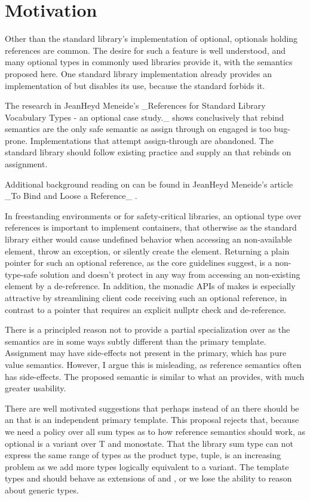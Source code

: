 \documentclass[a4paper,10pt,oneside,openany,final,article]{memoir}
\begin{document}
\chapter{Motivation}
Other than the standard library's implementation of optional, optionals holding references are common. The desire for such a feature is well understood, and many optional types in commonly used libraries provide it, with the semantics proposed here.
One standard library implementation already provides an implementation of  but disables its use, because the standard forbids it.

The research in JeanHeyd Meneide's _References for Standard Library Vocabulary Types - an optional case study._ \cite{P1683R0} shows conclusively that rebind semantics are the only safe semantic as assign through on engaged is too bug-prone. Implementations that attempt assign-through are abandoned. The standard library should follow existing practice and supply an  that rebinds on assignment.

Additional background reading on  can be found in JeanHeyd Meneide's article _To Bind and Loose a Reference_ \cite{REFBIND}.

In freestanding environments or for safety-critical libraries, an optional type over references is important to implement containers, that otherwise as the standard library either would cause undefined behavior when accessing an non-available element, throw an exception, or silently create the element. Returning a plain pointer for such an optional reference, as the core guidelines suggest, is a non-type-safe solution and doesn't protect in any way from accessing an non-existing element by a  de-reference. In addition, the monadic APIs of  makes is especially attractive by streamlining client code receiving such an optional reference, in contrast to a pointer that requires an explicit nullptr check and de-reference.

There is a principled reason not to provide a partial specialization over  as the semantics are in some ways subtly different than the primary template. Assignment may have side-effects not present in the primary, which has pure value semantics. However, I argue this is misleading, as reference semantics often has side-effects. The proposed semantic is similar to what an  provides, with much greater usability.

There are well motivated suggestions that perhaps instead of an  there should be an  that is an independent primary template. This proposal rejects that, because we need a policy over all sum types as to how reference semantics should work, as optional is a variant over T and monostate. That the library sum type can not express the same range of types as the product type, tuple, is an increasing problem as we add more types logically equivalent to a variant. The template types  and  should behave as extensions of  and , or we lose the ability to reason about generic types.
\end{document}
